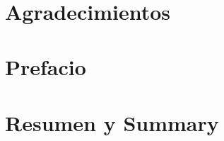 \documentclass[a4paper,12pt]{book}
\begin{document}
\pagestyle{empty}

\newpage 
\ %
\newpage


\frontmatter
\chapter*{}

\frontmatter
\chapter*{}

\chapter*{Agradecimientos}


\chapter*{Prefacio}


\chapter*{Resumen y Summary}


\renewcommand{\baselinestretch}{0.1}\normalsize
\tableofcontents
\renewcommand{\baselinestretch}{0.3}\normalsize
\listoffigures
\renewcommand{\baselinestretch}{0.3}\normalsize
\listoftables
\renewcommand{\baselinestretch}{1.2}\normalsize
\end{document}

